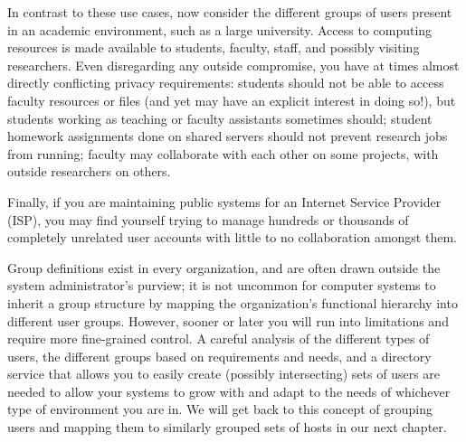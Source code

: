 In contrast to these use cases, now consider the
different groups of users present in an academic
environment, such as a large university.  Access to
computing resources is made available to students,
faculty, staff, and possibly visiting researchers.
Even disregarding any outside compromise, you have at
times almost directly conflicting privacy
requirements: students should not be able to access
faculty resources or files (and yet may have an
explicit interest in doing so!), but students working
as teaching or faculty assistants sometimes should;
student homework assignments done on shared servers
should not prevent research jobs from running; faculty
may collaborate with each other on some projects, with
outside researchers on others.

Finally, if you are maintaining public systems for an
Internet Service Provider (ISP), you may find yourself
trying to manage hundreds or thousands of completely
unrelated user accounts with little to no
collaboration amongst them.


Group definitions exist in every organization, and are
often drawn outside the system administrator's
purview; it is not uncommon for computer systems to
inherit a group structure by mapping the
organization's functional hierarchy into different
user groups.  However, sooner or later you will run
into limitations and require more fine-grained
control.  A careful analysis of the different types of
users, the different groups based on requirements and
needs, and a directory service that allows you to
easily create (possibly intersecting) sets of users
are needed to allow your systems to grow with and
adapt to the needs of whichever type of environment
you are in.  We will get back to this concept of
grouping users and mapping them to similarly grouped
sets of hosts in our next chapter.

